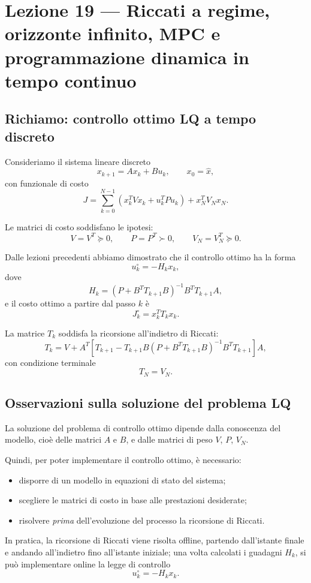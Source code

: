 \chapter{Lezione 19 --- Riccati a regime, orizzonte infinito, MPC e programmazione dinamica in tempo continuo}

\section{Richiamo: controllo ottimo LQ a tempo discreto}

Consideriamo il sistema lineare discreto
\[
x_{k+1}=Ax_k+Bu_k,
\qquad x_0=\hat x,
\]
con funzionale di costo
\[
J=\sum_{k=0}^{N-1}\left(x_k^T V x_k+u_k^T P u_k\right)+x_N^T V_N x_N.
\]

Le matrici di costo soddisfano le ipotesi:
\[
V=V^T\succeq 0,
\qquad
P=P^T\succ 0,
\qquad
V_N=V_N^T\succeq 0.
\]

Dalle lezioni precedenti abbiamo dimostrato che il controllo ottimo ha la forma
\[
u_k^\circ=-H_k x_k,
\]
dove
\[
H_k=\left(P+B^T T_{k+1}B\right)^{-1}B^T T_{k+1}A,
\]
e il costo ottimo a partire dal passo \(k\) è
\[
J_k^\circ=x_k^T T_k x_k.
\]

La matrice \(T_k\) soddisfa la ricorsione all'indietro di Riccati:
\[
T_k
=
V
+
A^T
\left[
T_{k+1}
-
T_{k+1}B\left(P+B^T T_{k+1}B\right)^{-1}B^T T_{k+1}
\right]
A,
\]
con condizione terminale
\[
T_N=V_N.
\]

\section{Osservazioni sulla soluzione del problema LQ}

La soluzione del problema di controllo ottimo dipende dalla conoscenza del modello,
cioè delle matrici \(A\) e \(B\), e dalle matrici di peso \(V\), \(P\), \(V_N\).

Quindi, per poter implementare il controllo ottimo, è necessario:
\begin{itemize}
    \item disporre di un modello in equazioni di stato del sistema;
    \item scegliere le matrici di costo in base alle prestazioni desiderate;
    \item risolvere \emph{prima} dell'evoluzione del processo la ricorsione di Riccati.
\end{itemize}

In pratica, la ricorsione di Riccati viene risolta offline, partendo dall'istante finale
e andando all'indietro fino all'istante iniziale; una volta calcolati i guadagni
\(
H_k
\),
si può implementare online la legge di controllo
\[
u_k^\circ=-H_k x_k.
\]


